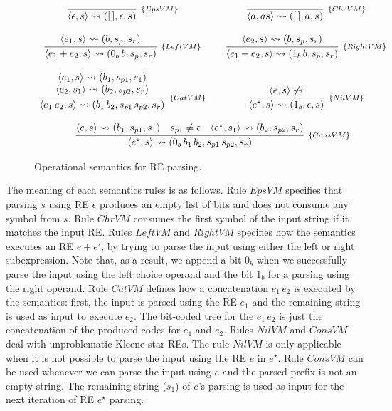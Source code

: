\documentclass[review]{elsarticle}
\theoremstyle{definition}
\begin{document}
\begin{figure}[h]
  \[
     \begin{array}{ccc}
        \infer[_{\{EpsVM\}}]{\langle \epsilon, s\rangle \leadsto ([\,],\epsilon,s)}{} & &
        \infer[_{\{ChrVM\}}]{\langle a, as\rangle\leadsto ([\,],a,s)}{} \\ \\
        \infer[_{\{LeftVM\}}]{\langle e_1 + e_2,s\rangle\leadsto (0_b\,b,s_p,s_r)}{\langle e_1, s\rangle \leadsto (b,s_p,s_r)} & &
        \infer[_{\{RightVM\}}]{\langle e_1 + e_2,s\rangle\leadsto (1_b\,b,s_p,s_r)}{
                                                                \langle e_2, s\rangle \leadsto (b,s_p,s_r)} \\ \\
        \infer[_{\{CatVM\}}]{\langle e_1\:e_2,s\rangle\leadsto (b_1\,b_2,s_{p1}\,s_{p2},s_r)}
              {\begin{array}{c}
                  \langle e_1, s\rangle \leadsto (b_1,s_{p1},s_1) \\
                  \langle e_2, s_1\rangle \leadsto (b_2,s_{p2},s_r)
              \end{array}} & & 
        \infer[_{\{NilVM\}}]{\langle e^\star, s\rangle\leadsto
                               (1_b,\epsilon,s)}{\langle e, s \rangle
                               \not\leadsto}\\ \\

        \multicolumn{3}{c}{
           \infer[_{\{ConsVM\}}]{\langle e^\star, s\rangle\leadsto (0_b\,b_1\,b_2,s_{p1}\,s_{p2},s_r)}
                 {\langle e, s \rangle \leadsto (b_1,s_{p1},s_1) & s_{p1} \neq \epsilon &
                  \langle e^\star, s_1 \rangle \leadsto (b_2, s_{p2},s_r)}
        }
     \end{array}
  \]
  \caption{Operational semantics for RE parsing.}
  \label{figure:bigstepsemantics}
\end{figure}

The meaning of each semantics rules is as follows. Rule $EpsVM$ specifies that parsing $s$ using RE $\epsilon$ produces 
an empty list of bits and does not consume any symbol from $s$. Rule $ChrVM$ consumes the first symbol of the input string
if it matches the input RE.  Rules $LeftVM$ and 
$RightVM$ specifies how the semantics executes an RE $e + e'$, by trying to
parse the input using either the left or right subexpression. Note that, as a result, we append a bit $0_b$ when we successfully 
parse the input using the left choice operand and the bit $1_b$ for a parsing using the right operand. Rule $CatVM$ defines 
how a concatenation $e_1\,e_2$ is executed by the semantics: first, the input is parsed using the RE $e_1$ and the remaining 
string is used as input to execute $e_2$. The bit-coded tree for the $e_1\,e_2$ is just the concatenation of the produced 
codes for $e_1$ and $e_2$. Rules $NilVM$ and $ConsVM$ deal with unproblematic Kleene star REs. The rule $NilVM$ is only applicable when
it is not possible to parse the input using the RE $e$ in $e^\star$. Rule $ConsVM$ can be used whenever we can parse the
input using $e$ and the parsed prefix is not an empty string. The remaining string ($s_1$) of $e$'s parsing is used as
input for the next iteration of RE $e^\star$ parsing. 
\end{document}
